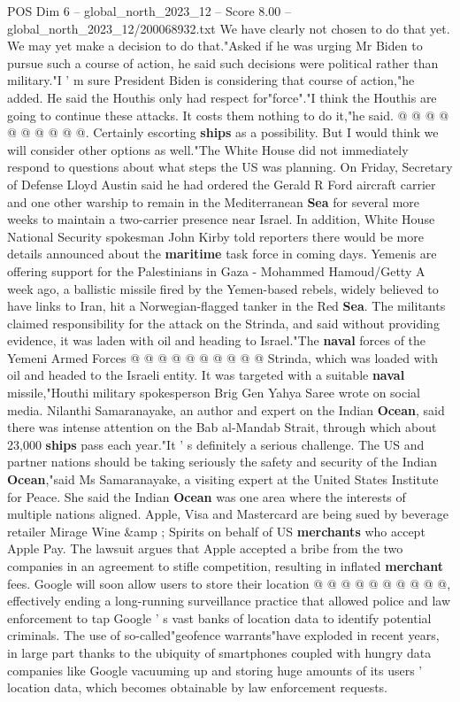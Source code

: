 \begin{textsample}{POS Dim 6 – global\_north\_2023\_12 – Score 8.00 – global\_north\_2023\_12/200068932.txt}
We have clearly not chosen to do that yet.
We may yet make a decision to do that."Asked if he was urging Mr Biden to pursue such a course of action, he said such decisions were political rather than military."I ' m sure President Biden is considering that course of action,"he added.
He said the Houthis only had respect for"force"."I think the Houthis are going to continue these attacks.
It costs them nothing to do it,"he said. @ @ @ @ @ @ @ @ @ @.
Certainly escorting \textbf{ships} as a possibility.
But I would think we will consider other options as well."The White House did not immediately respond to questions about what steps the US was planning.
On Friday, Secretary of Defense Lloyd Austin said he had ordered the Gerald R Ford aircraft carrier and one other warship to remain in the Mediterranean \textbf{Sea} for several more weeks to maintain a two-carrier presence near Israel.
In addition, White House National Security spokesman John Kirby told reporters there would be more details announced about the \textbf{maritime} task force in coming days.
Yemenis are offering support for the Palestinians in Gaza - Mohammed Hamoud/Getty A week ago, a ballistic missile fired by the Yemen-based rebels, widely believed to have links to Iran, hit a Norwegian-flagged tanker in the Red \textbf{Sea}.
The militants claimed responsibility for the attack on the Strinda, and said without providing evidence, it was laden with oil and heading to Israel."The \textbf{naval} forces of the Yemeni Armed Forces @ @ @ @ @ @ @ @ @ @ Strinda, which was loaded with oil and headed to the Israeli entity.
It was targeted with a suitable \textbf{naval} missile,"Houthi military spokesperson Brig Gen Yahya Saree wrote on social media.
Nilanthi Samaranayake, an author and expert on the Indian \textbf{Ocean}, said there was intense attention on the Bab al-Mandab Strait, through which about 23,000 \textbf{ships} pass each year."It ' s definitely a serious challenge.
The US and partner nations should be taking seriously the safety and security of the Indian \textbf{Ocean},"said Ms Samaranayake, a visiting expert at the United States Institute for Peace.
She said the Indian \textbf{Ocean} was one area where the interests of multiple nations aligned.
Apple, Visa and Mastercard are being sued by beverage retailer Mirage Wine \&amp ; Spirits on behalf of US \textbf{merchants} who accept Apple Pay.
The lawsuit argues that Apple accepted a bribe from the two companies in an agreement to stifle competition, resulting in inflated \textbf{merchant} fees.
Google will soon allow users to store their location @ @ @ @ @ @ @ @ @ @, effectively ending a long-running surveillance practice that allowed police and law enforcement to tap Google ' s vast banks of location data to identify potential criminals.
The use of so-called"geofence warrants"have exploded in recent years, in large part thanks to the ubiquity of smartphones coupled with hungry data companies like Google vacuuming up and storing huge amounts of its users ' location data, which becomes obtainable by law enforcement requests.

\end{textsample}
